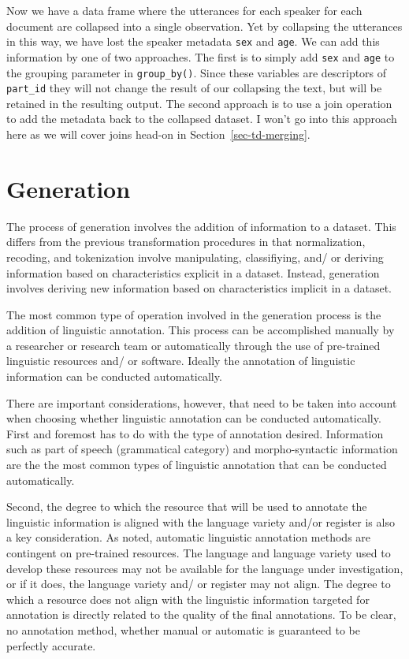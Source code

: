 \documentclass[
  letterpaper,
  DIV=11,
  numbers=noendperiod]{scrreport}
\theoremstyle{definition}
\theoremstyle{remark}
\begin{document}
Now we have a data frame where the utterances for each speaker for each
document are collapsed into a single observation. Yet by collapsing the
utterances in this way, we have lost the speaker metadata \texttt{sex}
and \texttt{age}. We can add this information by one of two approaches.
The first is to simply add \texttt{sex} and \texttt{age} to the grouping
parameter in \texttt{group\_by()}. Since these variables are descriptors
of \texttt{part\_id} they will not change the result of our collapsing
the text, but will be retained in the resulting output. The second
approach is to use a join operation to add the metadata back to the
collapsed dataset. I won't go into this approach here as we will cover
joins head-on in Section~\ref{sec-td-merging}.

\hypertarget{sec-td-generation}{%
\section{Generation}\label{sec-td-generation}}

The process of generation involves the addition of information to a
dataset. This differs from the previous transformation procedures in
that normalization, recoding, and tokenization involve manipulating,
classifiying, and/ or deriving information based on characteristics
explicit in a dataset. Instead, generation involves deriving new
information based on characteristics implicit in a dataset.

The most common type of operation involved in the generation process is
the addition of linguistic annotation. This process can be accomplished
manually by a researcher or research team or automatically through the
use of pre-trained linguistic resources and/ or software. Ideally the
annotation of linguistic information can be conducted automatically.

There are important considerations, however, that need to be taken into
account when choosing whether linguistic annotation can be conducted
automatically. First and foremost has to do with the type of annotation
desired. Information such as part of speech (grammatical category) and
morpho-syntactic information are the the most common types of linguistic
annotation that can be conducted automatically.

Second, the degree to which the resource that will be used to annotate
the linguistic information is aligned with the language variety and/or
register is also a key consideration. As noted, automatic linguistic
annotation methods are contingent on pre-trained resources. The language
and language variety used to develop these resources may not be
available for the language under investigation, or if it does, the
language variety and/ or register may not align. The degree to which a
resource does not align with the linguistic information targeted for
annotation is directly related to the quality of the final annotations.
To be clear, no annotation method, whether manual or automatic is
guaranteed to be perfectly accurate.
\end{document}
